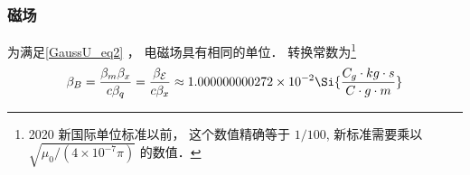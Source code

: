 \subsubsection{磁场}
为满足\autoref{GaussU_eq2} ， 电磁场具有相同的单位． 转换常数为\footnote{2020 新国际单位标准以前， 这个数值精确等于 $1/100$, 新标准需要乘以 $\sqrt{\mu_0/(4\times 10^{-7}\pi)}$ 的数值．}
\begin{equation}
\beta_B = \frac{\beta_m\beta_x}{c\beta_q} = \frac{\beta_{\mathcal E}}{c\beta_x} \approx 1.000000000272\times 10^{-2} \Si{\frac{C_g\cdot kg \cdot s}{C \cdot g \cdot m}}
\end{equation}
